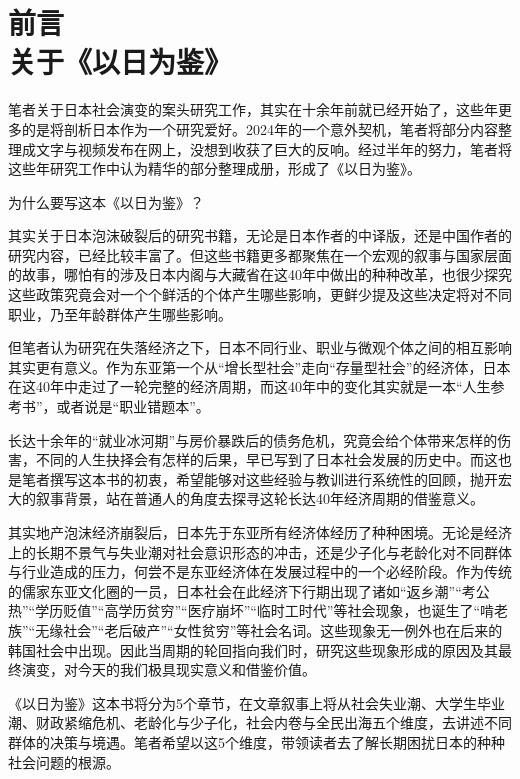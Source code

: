 
\section[前言\q 关于《以日为鉴》]{前言\\ 关于《以日为鉴》}

笔者关于日本社会演变的案头研究工作，其实在十余年前就已经开始了，这些年更多的是将剖析日本作为一个研究爱好。2024年的一个意外契机，笔者将部分内容整理成文字与视频发布在网上，没想到收获了巨大的反响。经过半年的努力，笔者将这些年研究工作中认为精华的部分整理成册，形成了《以日为鉴》。

为什么要写这本《以日为鉴》？

其实关于日本泡沫破裂后的研究书籍，无论是日本作者的中译版，还是中国作者的研究内容，已经比较丰富了。但这些书籍更多都聚焦在一个宏观的叙事与国家层面的故事，哪怕有的涉及日本内阁与大藏省在这40年中做出的种种改革，也很少探究这些政策究竟会对一个个鲜活的个体产生哪些影响，更鲜少提及这些决定将对不同职业，乃至年龄群体产生哪些影响。

但笔者认为研究在失落经济之下，日本不同行业、职业与微观个体之间的相互影响其实更有意义。作为东亚第一个从“增长型社会”走向“存量型社会”的经济体，日本在这40年中走过了一轮完整的经济周期，而这40年中的变化其实就是一本“人生参考书”，或者说是“职业错题本”。

长达十余年的“就业冰河期”与房价暴跌后的债务危机，究竟会给个体带来怎样的伤害，不同的人生抉择会有怎样的后果，早已写到了日本社会发展的历史中。而这也是笔者撰写这本书的初衷，希望能够对这些经验与教训进行系统性的回顾，抛开宏大的叙事背景，站在普通人的角度去探寻这轮长达40年经济周期的借鉴意义。

其实地产泡沫经济崩裂后，日本先于东亚所有经济体经历了种种困境。无论是经济上的长期不景气与失业潮对社会意识形态的冲击，还是少子化与老龄化对不同群体与行业造成的压力，何尝不是东亚经济体在发展过程中的一个必经阶段。作为传统的儒家东亚文化圈的一员，日本社会在此经济下行期出现了诸如“返乡潮”“考公热”“学历贬值”“高学历贫穷”“医疗崩坏”“临时工时代”等社会现象，也诞生了“啃老族”“无缘社会”“老后破产”“女性贫穷”等社会名词。这些现象无一例外也在后来的韩国社会中出现。因此当周期的轮回指向我们时，研究这些现象形成的原因及其最终演变，对今天的我们极具现实意义和借鉴价值。

《以日为鉴》这本书将分为5个章节，在文章叙事上将从社会失业潮、大学生毕业潮、财政紧缩危机、老龄化与少子化，社会内卷与全民出海五个维度，去讲述不同群体的决策与境遇。笔者希望以这5个维度，带领读者去了解长期困扰日本的种种社会问题的根源。

